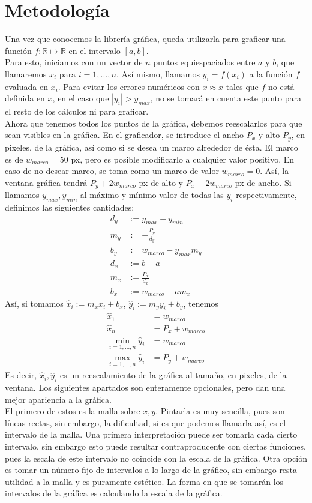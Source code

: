 \documentclass[10pt]{article}
\begin{document}
\section{Metodología}
Una vez que conocemos la librería gráfica, queda utilizarla para graficar una función $f:\mathbb{R}\mapsto\mathbb{R}$ en el intervalo $\left[a,b\right]$.\\
Para esto, iniciamos con un vector de $n$ puntos equiespaciados entre $a$ y $b$, que llamaremos $x_i$ para $i=1,...,n$. Así mismo, llamamos $y_i=f(x_i)$ a la función $f$ evaluada en $x_i$. Para evitar los errores numéricos con $x\approx x$ tales que $f$ no está definida en $x$, en el caso que $\left|y_i\right|>y_{max}$, no se tomará en cuenta este punto para el resto de los cálculos ni para graficar.\\
Ahora que tenemos todos los puntos de la gráfica, debemos reescalarlos para que sean visibles en la gráfica. En el graficador, se introduce el ancho $P_x$ y alto $P_y$, en pixeles, de la gráfica, así como si se desea un marco alrededor de ésta. El marco es de $w_{marco}=50$ px, pero es posible modificarlo a cualquier valor positivo. En caso de no desear marco, se toma como un marco de valor $w_{marco}=0$. Así, la ventana gráfica tendrá $P_y+2w_{marco}$ px de alto y $P_x+2w_{marco}$ px de ancho. Si llamamos $y_{max}, y_{min}$ al máximo y mínimo valor de todas las $y_i$ respectivamente, definimos las siguientes cantidades:
\begin{align*}
d_y&:=y_{max}-y_{min}\\
m_y&:=-\frac{P_y}{d_y}\\
b_y&:=w_{marco}-y_{max}m_y\\
d_x&:=b-a\\
m_x&:=\frac{P_x}{d_x}\\
b_x&:=w_{marco}-am_x
\end{align*}
Así, si tomamos $\hat{x}_i:=m_xx_i+b_x$, $\hat{y}_i:=m_yy_i+b_y$, tenemos
\begin{align*}
\hat{x}_1&=w_{marco}\\
\hat{x}_n&=P_x+w_{marco}\\
\min\limits_{i=1,...,n}\hat{y}_i&=w_{marco}\\
\max\limits_{i=1,...,n}\hat{y}_i&=P_y+w_{marco}
\end{align*}
Es decir, $\hat{x}_i,\hat{y}_i$ es un reescalamiento de la gráfica al tamaño, en pixeles, de la ventana. Los siguientes apartados son enteramente opcionales, pero dan una mejor apariencia a la gráfica.\\
El primero de estos es la malla sobre $x,y$. Pintarla es muy sencilla, pues son líneas rectas, sin embargo, la dificultad, si es que podemos llamarla así, es el intervalo de la malla. Una primera interpretación puede ser tomarla cada cierto intervalo, sin embargo esto puede resultar contraproducente con ciertas funciones, pues la escala de este intervalo no coincide con la escala de la gráfica. Otra opción es tomar un número fijo de intervalos a lo largo de la gráfico, sin embargo resta utilidad a la malla y es puramente estético. La forma en que se tomarán los intervalos de la gráfica es calculando la escala de la gráfica.
\end{document}
